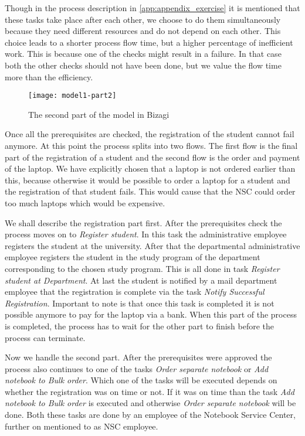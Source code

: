 Though in the process description in \autoref{app:appendix_exercise} it is mentioned that these tasks take place after each other,
we choose to do them simultaneously because they need different resources and do not depend on each other.
This choice leads to a shorter process flow time, but a higher percentage of inefficient work.
This is because one of the checks might result in a failure.
In that case both the other checks should not have been done, but we value the flow time more than the efficiency.

\begin{figure}[H]
	\centering
	\texttt{[image: model1-part2]}
	\caption{The second part of the model in Bizagi}
	\label{fig:model1-part2}
\end{figure}

Once all the prerequisites are checked, the registration of the student cannot fail anymore.
At this point the process splits into two flows.
The first flow is the final part of the registration of a student and the second flow is the order and payment of the laptop.
We have explicitly chosen that a laptop is not ordered earlier than this, because otherwise it would be possible to order a laptop for a student and the registration of that student fails.
This would cause that the NSC could order too much laptops which would be expensive.

We shall describe the registration part first.
After the prerequisites check the process moves on to \emph{Register student}.
In this task the administrative employee registers the student at the university.
After that the departmental administrative employee registers the student in the study program of the department corresponding to the chosen study program.
This is all done in task \emph{Register student at Department}.
At last the student is notified by a mail department employee that the registration is complete via the task \emph{Notify Successful Registration}.
Important to note is that once this task is completed it is not possible anymore to pay for the laptop via a bank.
When this part of the process is completed, the process has to wait for the other part to finish before the process can terminate.

Now we handle the second part.
After the prerequisites were approved the process also continues to one of the tasks \emph{Order separate notebook} or \emph{Add notebook to Bulk order}.
Which one of the tasks will be executed depends on whether the registration was on time or not.
If it was on time than the task \emph{Add notebook to Bulk order} is executed and otherwise \emph{Order separate notebook} will be done.
Both these tasks are done by an employee of the Notebook Service Center, further on mentioned to as NSC employee.

